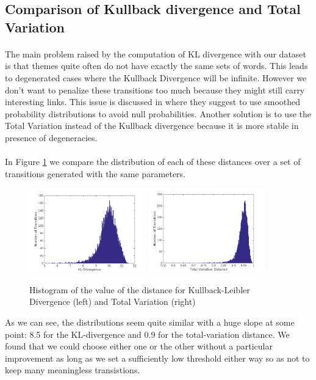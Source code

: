 \subsection{Comparison of Kullback divergence and Total Variation}

\paragraph{}
The main problem raised by the computation of KL divergence with our dataset is that themes quite often do not have exactly the same sets of words. This leads to degenerated cases where the Kullback Divergence will be infinite. However we don't want to penalize these transitions too much because they might still carry interesting links. This issue is discussed in \cite{de2010grammatical} where they suggest to use smoothed probability distributions to avoid null probabilities. Another solution is to use the Total Variation instead of the Kullback divergence because it is more stable in presence of degeneracies.

\paragraph{}
In Figure \ref{fig:distancecomparison} we compare the distribution of each of these distances over a set of transitions generated with the same parameters.
\begin{figure}[H]
\begin{center}
	\label{fig:distancecomparison}
	\includegraphics[width=0.45\textwidth]{images/divergence}
	\includegraphics[width=0.45\textwidth]{images/totalvariation}
	\caption{Histogram of the value of the distance for Kullback-Leibler Divergence (left) and Total Variation (right)}
\end{center}
\end{figure}
As we can see, the distributions seem quite similar with a huge slope at some point: 8.5 for the KL-divergence and 0.9 for the total-variation distance. We found that we could choose either one or the other without a particular improvement as long as we set a sufficiently low threshold either way so as not to keep many meaningless transistions.

